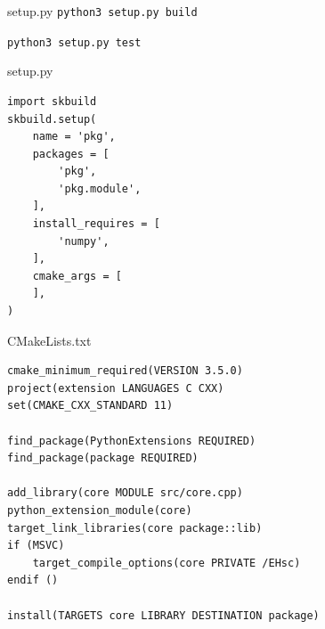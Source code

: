 \documentclass[pdf]{beamer}
\begin{document}
\begin{frame}[fragile]{setup.py}
    \verb|python3 setup.py build|

    \verb|python3 setup.py test|

\end{frame}

\begin{frame}[fragile]{setup.py}
\begin{verbatim}
import skbuild
skbuild.setup(
    name = 'pkg',
    packages = [
        'pkg',
        'pkg.module',
    ],
    install_requires = [
        'numpy',
    ],
    cmake_args = [
    ],
)
\end{verbatim}

\end{frame}

\begin{frame}[fragile]{CMakeLists.txt}
\begin{verbatim}
cmake_minimum_required(VERSION 3.5.0)
project(extension LANGUAGES C CXX)
set(CMAKE_CXX_STANDARD 11)

find_package(PythonExtensions REQUIRED)
find_package(package REQUIRED)

add_library(core MODULE src/core.cpp)
python_extension_module(core)
target_link_libraries(core package::lib)
if (MSVC)
    target_compile_options(core PRIVATE /EHsc)
endif ()

install(TARGETS core LIBRARY DESTINATION package)
\end{verbatim}

\end{frame}
\end{document}

